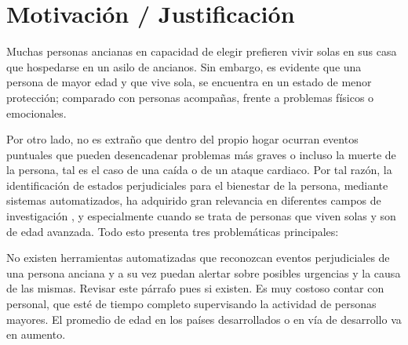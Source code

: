 
\newpage
\section{Motivación / Justificación}
\label{Motivation}
    
    
    Muchas personas ancianas en capacidad de elegir prefieren vivir solas en sus casa que hospedarse en un asilo de ancianos. Sin embargo, es evidente que una persona de mayor edad y que vive sola, se encuentra en un estado de menor protección; comparado con personas acompañas, frente a problemas físicos o emocionales. 
    
    Por otro lado, no es extraño que dentro del propio hogar ocurran eventos puntuales que pueden desencadenar problemas más graves o incluso la muerte de la persona, tal es el caso de una caída o de un ataque cardiaco. Por tal razón, la identificación de estados perjudiciales para el bienestar de la persona, mediante sistemas automatizados, ha adquirido gran relevancia en diferentes campos de investigación \cite{Fragopanagos2005}, y especialmente cuando se trata de personas que viven solas y son de edad avanzada. Todo esto presenta tres problemáticas principales:
    
    No existen herramientas automatizadas que reconozcan eventos perjudiciales de una persona anciana y a su vez puedan alertar sobre posibles urgencias y la causa de las mismas. Revisar este párrafo pues si existen.
    Es muy costoso contar con personal, que esté de tiempo completo supervisando la actividad de personas mayores.
    El promedio de edad en los países desarrollados o en vía de desarrollo va en aumento.
    
